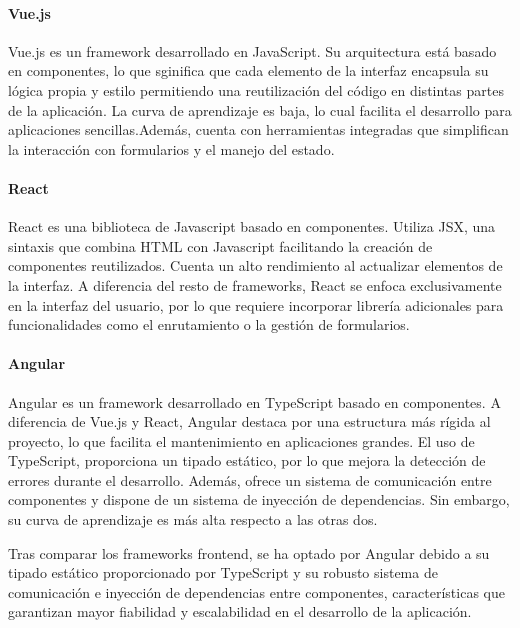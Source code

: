 \paragraph{Vue.js}
Vue.js \cite{wikipedia_vue} es un framework desarrollado en JavaScript. Su arquitectura está basado en componentes, lo que 
sginifica que cada elemento de la interfaz encapsula su lógica propia y estilo permitiendo una reutilización 
del código en distintas partes de la aplicación. La curva de aprendizaje es baja, lo cual facilita el
desarrollo para aplicaciones sencillas.Además, cuenta con herramientas integradas que simplifican la interacción 
con formularios y el manejo del estado.

\paragraph{React}   
React \cite{reactwiki2015} es una biblioteca de Javascript basado en componentes. Utiliza JSX, una sintaxis que combina HTML con Javascript 
facilitando la creación de componentes reutilizados. Cuenta un alto rendimiento al actualizar elementos de la interfaz.
A diferencia del resto de frameworks, React se enfoca exclusivamente en la 
interfaz del usuario, por lo que requiere incorporar librería adicionales para funcionalidades como
el enrutamiento o la gestión de formularios. 

\paragraph{Angular}
Angular \cite{wikipedia_angular} es un framework desarrollado en TypeScript basado en componentes. A diferencia de Vue.js y React, Angular destaca por una estructura 
más rígida al proyecto, lo que facilita el mantenimiento en aplicaciones grandes. El uso de TypeScript, proporciona
un tipado estático, por lo que mejora la detección de errores durante el desarrollo. Además, ofrece un sistema 
de comunicación entre componentes y dispone de un sistema de inyección de dependencias. Sin embargo, su curva de aprendizaje
es más alta respecto a las otras dos.

Tras comparar los frameworks frontend, se ha optado por Angular debido a su tipado estático proporcionado por TypeScript y su robusto 
sistema de comunicación e inyección de dependencias entre componentes, características que garantizan mayor fiabilidad y escalabilidad en el desarrollo de la aplicación.

